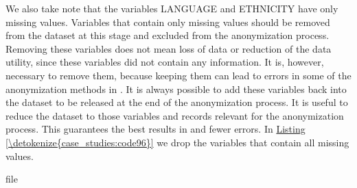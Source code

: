 \documentclass[letterpaper,10pt,english]{sphinxmanual}
\begin{document}
\def\sphinxLiteralBlockLabel{\label{\detokenize{case_studies:code95}}}
%
\begin{sphinxVerbatim}[commandchars=\\\{\},numbers=left,firstnumber=1,stepnumber=1]
\PYG{p}{[}\PYG{p}{]}\PYG{p}{[}\PYG{p}{[}\PYG{p}{]}  \PYG{p}{]}         
\PYG{p}{[}\PYG{p}{]}\PYG{p}{[}\PYG{p}{[}\PYG{p}{]}  \PYG{p}{]}        
\PYG{p}{[}\PYG{p}{]}\PYG{p}{[}\PYG{p}{[}\PYG{p}{]}  \PYG{p}{]}  
\end{sphinxVerbatim}

We also take note that the variables LANGUAGE and ETHNICITY have only
missing values. Variables that contain only missing values should be
removed from the dataset at this stage and excluded from the
anonymization process. Removing these variables does not mean loss of
data or reduction of the data utility, since these variables did not
contain any information. It is, however, necessary to remove them,
because keeping them can lead to errors in some of the anonymization
methods in . It is always possible to add these variables back into
the dataset to be released at the end of the anonymization process. It
is useful to reduce the dataset to those variables and records relevant
for the anonymization process. This guarantees the best results in 
and fewer errors. In \hyperref[\detokenize{case_studies:code96}]{Listing \ref{\detokenize{case_studies:code96}}} we drop the variables that contain all
missing values.

\def\sphinxLiteralBlockLabel{\label{\detokenize{case_studies:code96}}}
%
\begin{sphinxVerbatim}[commandchars=\\\{\},numbers=left,firstnumber=1,stepnumber=1]
file  \PYG{p}{[}   \PYG{p}{]}
\end{sphinxVerbatim}
\end{document}
